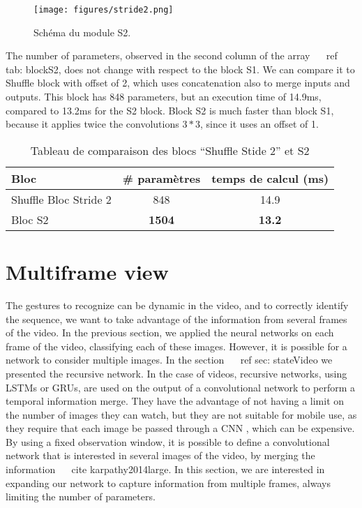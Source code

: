\documentclass[letterpaper, 10 pt, conference]{ieeeconf}  %
\begin{document}
\begin{figure}%
\centering
\texttt{[image: figures/stride2.png]}%
\caption{Schéma du module S2.}%
\label{fig:S2}%
\end{figure}



The number of parameters, observed in the second column of the array ~ \ ref {tab: blockS2}, does not change with respect to the block S1.
We can compare it to Shuffle block with offset of 2, which uses concatenation also to merge inputs and outputs.
This block has 848 parameters, but an execution time of 14.9ms, compared to 13.2ms for the S2 block.
Block S2 is much faster than block S1, because it applies twice the convolutions $ 3 * 3 $, since it uses an offset of 1.



\begin{table}[h]
\centering
\begin{tabular}{|l|c|c|}
\hline
Bloc & \# paramètres & temps de calcul (ms) \\
\hline
\hline
Shuffle Bloc Stride 2 & 848 & 14.9 \\
\hline
Bloc S2 & \textbf{1504} & \textbf{13.2}\\
\hline
\end{tabular}
\caption{Tableau de comparaison des blocs ``Shuffle Stide 2'' et S2}
\label{tab:blocS2}
\end{table}



\section{Multiframe view}

The gestures to recognize can be dynamic in the video, and to correctly identify the sequence, we want to take advantage of the information from several frames of the video.
In the previous section, we applied the neural networks on each frame of the video, classifying each of these images.
However, it is possible for a network to consider multiple images.
In the section ~ \ ref {sec: stateVideo} we presented the recursive network.
In the case of videos, recursive networks, using LSTMs or GRUs, are used on the output of a convolutional network to perform a temporal information merge.
They have the advantage of not having a limit on the number of images they can watch, but they are not suitable for mobile use, as they require that each image be passed through a CNN , which can be expensive.
By using a fixed observation window, it is possible to define a convolutional network that is interested in several images of the video, by merging the information ~ \ cite {karpathy2014large}.
In this section, we are interested in expanding our network to capture information from multiple frames, always limiting the number of parameters.
\end{document}
